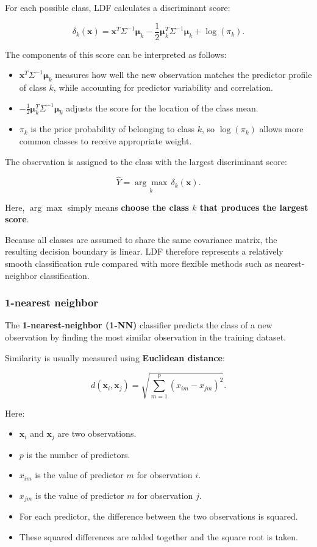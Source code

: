 \documentclass[
  letterpaper,
  DIV=11,
  numbers=noendperiod]{scrreprt}
\providecommand{\tightlist}{%
  \setlength{\itemsep}{0pt}\setlength{\parskip}{0pt}}
\begin{document}
For each possible class, LDF calculates a discriminant score:

\[
\delta_k(\mathbf{x})
=
\mathbf{x}^T\Sigma^{-1}\boldsymbol{\mu}_k
-
\frac{1}{2}
\boldsymbol{\mu}_k^T\Sigma^{-1}\boldsymbol{\mu}_k
+
\log(\pi_k).
\]

The components of this score can be interpreted as follows:

\begin{itemize}
\tightlist
\item
  \(\mathbf{x}^T\Sigma^{-1}\boldsymbol{\mu}_k\) measures how well the
  new observation matches the predictor profile of class \(k\), while
  accounting for predictor variability and correlation.
\item
  \(-\frac{1}{2}\boldsymbol{\mu}_k^T\Sigma^{-1}\boldsymbol{\mu}_k\)
  adjusts the score for the location of the class mean.
\item
  \(\pi_k\) is the prior probability of belonging to class \(k\), so
  \(\log(\pi_k)\) allows more common classes to receive appropriate
  weight.
\end{itemize}

The observation is assigned to the class with the largest discriminant
score:

\[
\widehat{Y}
=
\underset{k}{\arg\max}\,
\delta_k(\mathbf{x}).
\]

Here, \(\arg\max\) simply means \textbf{choose the class \(k\) that
produces the largest score}.

Because all classes are assumed to share the same covariance matrix, the
resulting decision boundary is linear. LDF therefore represents a
relatively smooth classification rule compared with more flexible
methods such as nearest-neighbor classification.

\subsubsection{1-nearest neighbor}\label{nearest-neighbor}

The \textbf{1-nearest-neighbor (1-NN)} classifier predicts the class of
a new observation by finding the most similar observation in the
training dataset.

Similarity is usually measured using \textbf{Euclidean distance}:

\[
d(\mathbf{x}_i,\mathbf{x}_j)
=
\sqrt{
\sum_{m=1}^{p}
(x_{im}-x_{jm})^2
}.
\]

Here:

\begin{itemize}
\tightlist
\item
  \(\mathbf{x}_i\) and \(\mathbf{x}_j\) are two observations.
\item
  \(p\) is the number of predictors.
\item
  \(x_{im}\) is the value of predictor \(m\) for observation \(i\).
\item
  \(x_{jm}\) is the value of predictor \(m\) for observation \(j\).
\item
  For each predictor, the difference between the two observations is
  squared.
\item
  These squared differences are added together and the square root is
  taken.
\end{itemize}
\end{document}
